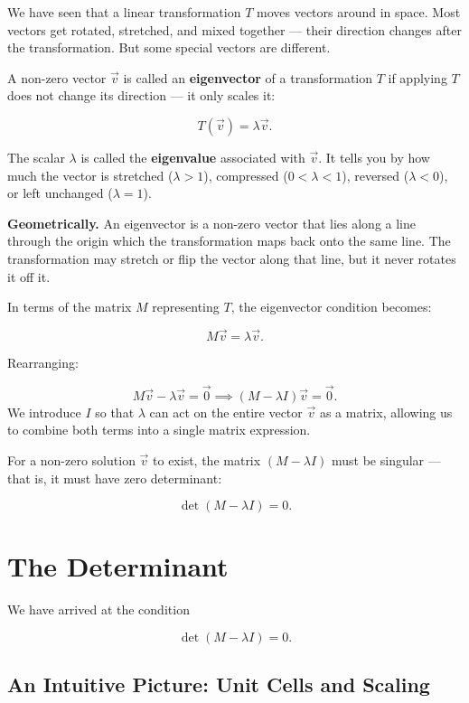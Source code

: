 \documentclass[11pt,openany]{book}
\theoremstyle{definition}
\begin{document}
We have seen that a linear transformation $T$ moves vectors around in space. Most 
vectors get rotated, stretched, and mixed together --- their direction changes after 
the transformation. But some special vectors are different.

\medskip

A non-zero vector $\vec{v}$ is called an \textbf{eigenvector} of a transformation 
$T$ if applying $T$ does not change its direction --- it only scales it:

\[
T(\vec{v}) = \lambda \vec{v}.
\]

The scalar $\lambda$ is called the \textbf{eigenvalue} associated with $\vec{v}$. 
It tells you by how much the vector is stretched ($\lambda > 1$), compressed 
($0 < \lambda < 1$), reversed ($\lambda < 0$), or left unchanged ($\lambda = 1$).

\medskip

\textbf{Geometrically.} An eigenvector is a non-zero vector that lies along a line through the origin 
which the transformation maps back onto the same line. The transformation may stretch 
or flip the vector along that line, but it never rotates it off it.

\medskip

In terms of the matrix $M$ representing $T$, the eigenvector condition becomes:

\[
M\vec{v} = \lambda\vec{v}.
\]

Rearranging:

\[
M\vec{v} - \lambda\vec{v} = \vec{0}
\implies
(M - \lambda I)\vec{v} = \vec{0}.
\]
We introduce $I$ so that $\lambda$ can act on the entire vector $\vec{v}$ as a matrix, allowing us to combine both terms into a single matrix expression.

\medskip

For a non-zero solution $\vec{v}$ to exist, the matrix $(M - \lambda I)$ must be 
singular --- that is, it must have zero determinant:

\[
\det(M - \lambda I) = 0.
\]

\section{The Determinant}

We have arrived at the condition

\[
\det(M - \lambda I) = 0.
\]

\subsection{An Intuitive Picture: Unit Cells and Scaling}
\end{document}
